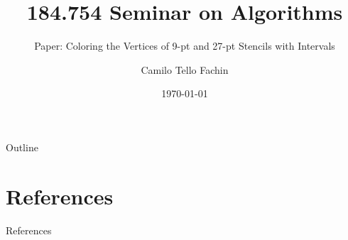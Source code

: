 \documentclass{beamer}
\title[Seminar on Algorithms]{%
  184.754 Seminar on Algorithms 
}
\subtitle{Paper: Coloring the Vertices of 9-pt and 27-pt Stencils
with Intervals}
\author{Camilo Tello Fachin}
\date{\today}
\begin{document}
\begin{frame}
  \titlepage
\end{frame}

\begin{frame}{Outline}
  \tableofcontents
\end{frame}













\section{References}
\begin{frame}{References}

  \tiny\printbibliography
  
\end{frame}
\end{document}
